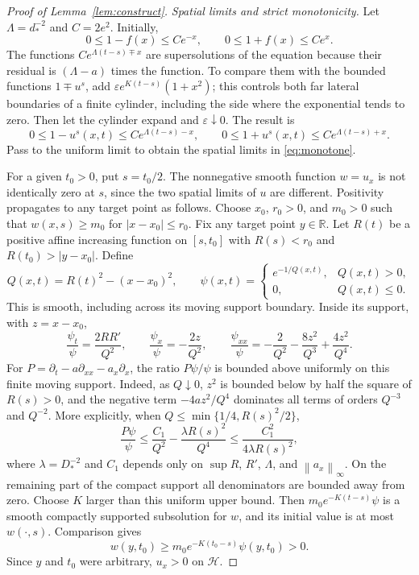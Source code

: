 \documentclass[11pt,reqno]{amsart}
\numberwithin{equation}{section}
\theoremstyle{definition}
\theoremstyle{remark}
\newcommand{\R}{\mathbb R}
\newcommand{\HH}{\mathcal H}
\newcommand{\norm}[1]{\left\lVert#1\right\rVert}
\begin{document}
\begin{proof}[Proof of Lemma~\ref{lem:construct}]
\emph{Spatial limits and strict monotonicity.}
Let $\Lambda=d_*^{-2}$ and $C=2e^2$. Initially,
\[
 0\leq1-f(x)\leq Ce^{-x},\qquad
 0\leq1+f(x)\leq Ce^x.
\]
The functions $Ce^{\Lambda(t-s)\mp x}$ are supersolutions of the equation because their residual is $(\Lambda-a)$ times the function. To compare them with the bounded functions $1\mp u^s$, add $\varepsilon e^{K(t-s)}(1+x^2)$; this controls both far lateral boundaries of a finite cylinder, including the side where the exponential tends to zero. Then let the cylinder expand and $\varepsilon\downarrow0$. The result is
\[
 0\leq1-u^s(x,t)\leq Ce^{\Lambda(t-s)-x},\qquad
 0\leq1+u^s(x,t)\leq Ce^{\Lambda(t-s)+x}.
\]
Pass to the uniform limit to obtain the spatial limits in \eqref{eq:monotone}.

For a given $t_0>0$, put $s=t_0/2$. The nonnegative smooth function $w=u_x$ is not identically zero at $s$, since the two spatial limits of $u$ are different. Positivity propagates to any target point as follows. Choose $x_0$, $r_0>0$, and $m_0>0$ such that $w(x,s)\geq m_0$ for $|x-x_0|\leq r_0$. Fix any target point $y\in\R$. Let $R(t)$ be a positive affine increasing function on $[s,t_0]$ with $R(s)<r_0$ and $R(t_0)>|y-x_0|$. Define
\[
 Q(x,t)=R(t)^2-(x-x_0)^2,\qquad
 \psi(x,t)=
 \begin{cases}
 e^{-1/Q(x,t)},&Q(x,t)>0,\\
 0,&Q(x,t)\leq0.
 \end{cases}
\]
This is smooth, including across its moving support boundary. Inside its support, with $z=x-x_0$,
\[
 \frac{\psi_t}{\psi}=\frac{2RR'}{Q^2},\qquad
 \frac{\psi_x}{\psi}=-\frac{2z}{Q^2},\qquad
 \frac{\psi_{xx}}{\psi}
 =-\frac2{Q^2}-\frac{8z^2}{Q^3}+\frac{4z^2}{Q^4}.
\]
For $P=\partial_t-a\partial_{xx}-a_x\partial_x$, the ratio $P\psi/\psi$ is bounded above uniformly on this finite moving support. Indeed, as $Q\downarrow0$, $z^2$ is bounded below by half the square of $R(s)>0$, and the negative term $-4az^2/Q^4$ dominates all terms of orders $Q^{-3}$ and $Q^{-2}$. More explicitly, when $Q\leq\min\{1/4,R(s)^2/2\}$,
\[
 \frac{P\psi}{\psi}
 \leq\frac{C_1}{Q^2}-\frac{\lambda R(s)^2}{Q^4}
 \leq\frac{C_1^2}{4\lambda R(s)^2},
\]
where $\lambda=D_*^{-2}$ and $C_1$ depends only on $\sup R$, $R'$, $\Lambda$, and $\norm{a_x}_\infty$. On the remaining part of the compact support all denominators are bounded away from zero. Choose $K$ larger than this uniform upper bound. Then $m_0e^{-K(t-s)}\psi$ is a smooth compactly supported subsolution for $w$, and its initial value is at most $w(\cdot,s)$. Comparison gives
\[
 w(y,t_0)\geq m_0e^{-K(t_0-s)}\psi(y,t_0)>0.
\]
Since $y$ and $t_0$ were arbitrary, $u_x>0$ on $\HH$.
\end{proof}
\end{document}
